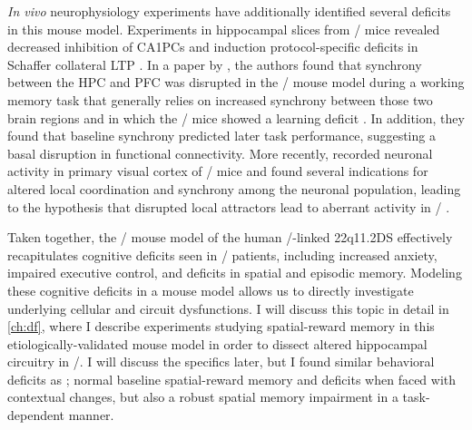 \textit{In vivo} neurophysiology experiments have additionally identified several deficits in this mouse model.
Experiments in hippocampal slices from \df/ mice revealed decreased inhibition of \acp{CA1PC} and induction protocol-specific deficits in Schaffer collateral \ac{LTP} \citep{Drew2011b}.
In a paper by \citeauthor{Sigurdsson2010}, the authors found that synchrony between the \ac{HPC} and \ac{PFC} was disrupted in the \df/ mouse model during a working memory task that generally relies on increased synchrony between those two brain regions and in which the \df/ mice showed a learning deficit \citep{Sigurdsson2010}.
In addition, they found that baseline synchrony predicted later task performance, suggesting a basal disruption in functional connectivity.
More recently, \citeauthor{Hamm2017} recorded neuronal activity in primary visual cortex of \df/ mice and found several indications for altered local coordination and synchrony among the neuronal population, leading to the hypothesis that disrupted local attractors lead to aberrant activity in \scz/ \citep{Hamm2017}.

Taken together, the \df/ mouse model of the human \scz/-linked \acl{22q11.2DS} effectively recapitulates cognitive deficits seen in \scz/ patients, including increased anxiety, impaired executive control, and deficits in spatial and episodic memory.
Modeling these cognitive deficits in a mouse model allows us to directly investigate underlying cellular and circuit dysfunctions.
I will discuss this topic in detail in \autoref{ch:df}, where I describe experiments studying spatial-reward memory in this etiologically-validated mouse model in order to dissect altered hippocampal circuitry in \scz/.
I will discuss the specifics later, but I found similar behavioral deficits as \citeauthor{Drew2011b}; normal baseline spatial-reward memory and deficits when faced with contextual changes, but also a robust spatial memory impairment in a task-dependent manner.

